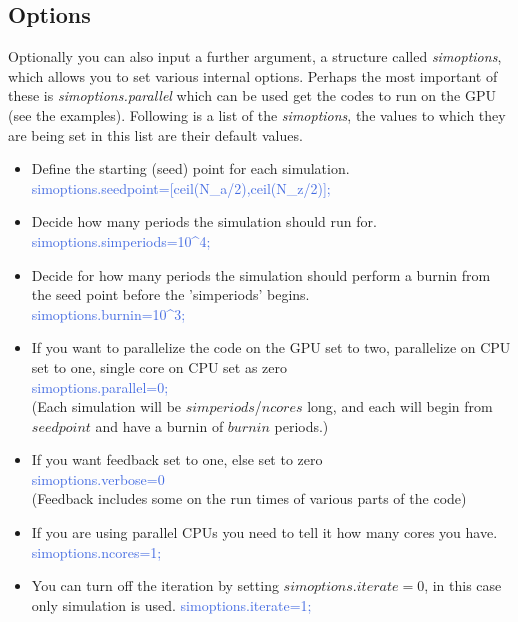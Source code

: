 \subsection{Options}
Optionally you can also input a further argument, a structure called \textit{simoptions}, which allows you to set various internal options. Perhaps
the most important of these is \textit{simoptions.parallel} which can be used get the codes to run on the GPU (see the examples).
Following is a list of the \textit{simoptions}, the values to which they are being set in this list are their default values.
\begin{itemize}
  \item Define the starting (seed) point for each simulation. \\
    \textcolor{RoyalBlue}{simoptions.seedpoint=[ceil(N\_{}a/2),ceil(N\_{}z/2)];}
  \item Decide how many periods the simulation should run for. \\
    \textcolor{RoyalBlue}{simoptions.simperiods=10\^{}4;}
  \item Decide for how many periods the simulation should perform a burnin from the seed point before the 'simperiods' begins. \\
    \textcolor{RoyalBlue}{simoptions.burnin=10\^{}3;}
  \item If you want to parallelize the code on the GPU set to two, parallelize on CPU set to one, single core on CPU set as zero \\
    \textcolor{RoyalBlue}{simoptions.parallel=0;} \\
    (Each simulation will be $simperiods$/$ncores$ long, and each will begin from $seedpoint$ and have a burnin of $burnin$ periods.)
  \item If you want feedback set to one, else set to zero \\
    \textcolor{RoyalBlue}{simoptions.verbose=0} \\
      (Feedback includes some on the run times of various parts of the code)
  \item If you are using parallel CPUs you need to tell it how many cores you have. \\
    \textcolor{RoyalBlue}{simoptions.ncores=1;}
  \item You can turn off the iteration by setting $simoptions.iterate=0$, in this case only simulation is used.
    \textcolor{RoyalBlue}{simoptions.iterate=1;}
\end{itemize}

